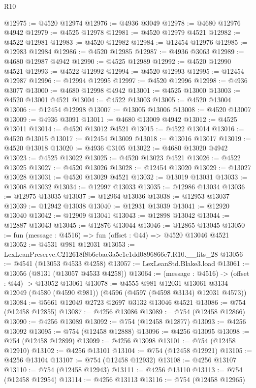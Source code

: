 \begin{lexlean}{R10}
\begin{coremodule}
@12975 := @4520 @12974
@12976 := @4936 @3049
@12978 := @4680 @12976 @4942
@12979 := @4525 @12978
@12981 := @4520 @12979 @4521
@12982 := @4522 @12981
@12983 := @4520 @12982
@12984 := @12454 @12976
@12985 := @12983 @12984
@12986 := @4520 @12985
@12987 := @4936 @3063
@12989 := @4680 @12987 @4942
@12990 := @4525 @12989
@12992 := @4520 @12990 @4521
@12993 := @4522 @12992
@12994 := @4520 @12993
@12995 := @12454 @12987
@12996 := @12994 @12995
@12997 := @4520 @12996
@12998 := @4936 @3077
@13000 := @4680 @12998 @4942
@13001 := @4525 @13000
@13003 := @4520 @13001 @4521
@13004 := @4522 @13003
@13005 := @4520 @13004
@13006 := @12454 @12998
@13007 := @13005 @13006
@13008 := @4520 @13007
@13009 := @4936 @3091
@13011 := @4680 @13009 @4942
@13012 := @4525 @13011
@13014 := @4520 @13012 @4521
@13015 := @4522 @13014
@13016 := @4520 @13015
@13017 := @12454 @13009
@13018 := @13016 @13017
@13019 := @4520 @13018
@13020 := @4936 @3105
@13022 := @4680 @13020 @4942
@13023 := @4525 @13022
@13025 := @4520 @13023 @4521
@13026 := @4522 @13025
@13027 := @4520 @13026
@13028 := @12454 @13020
@13029 := @13027 @13028
@13031 := @4520 @13029 @4521
@13032 := @13019 @13031
@13033 := @13008 @13032
@13034 := @12997 @13033
@13035 := @12986 @13034
@13036 := @12975 @13035
@13037 := @12964 @13036
@13038 := @12953 @13037
@13039 := @12942 @13038
@13040 := @12931 @13039
@13041 := @12920 @13040
@13042 := @12909 @13041
@13043 := @12898 @13042
@13044 := @12887 @13043
@13045 := @12876 @13044
@13046 := @12865 @13045
@13050 := fun (message : @4516) => fun (offset : @44) => @4520 @13046 @4521
@13052 := @4531 @981 @12031
@13053 := LexLeanPreserve.C212618f8b6ebac3a5c1e1dd0896866e7.R10.__fits_28
@13056 := @4541 (@13053 @4533 @4258)
@13057 := LexLeanStd.Blake3.load
@13061 := @13056 (@8131 (@13057 @4533 @4258))
@13064 := (message : @4516) -> (offset : @44) -> @13052 @13061
@13078 := @4555
    @981
    @12031
    @13061
    @3134
    @12049
    (@4580 (@4590 @981))
    (@4596 (@4597 (@4598 @3134) @12031 @4573))
@13084 := @5661 @12049 @2723 @2697 @3132 @13046 @4521
@13086 := @754 (@12458 @12855)
@13087 := @4256 @13086
@13089 := @754 (@12458 @12866)
@13090 := @4256 @13089
@13092 := @754 (@12458 @12877)
@13093 := @4256 @13092
@13095 := @754 (@12458 @12888)
@13096 := @4256 @13095
@13098 := @754 (@12458 @12899)
@13099 := @4256 @13098
@13101 := @754 (@12458 @12910)
@13102 := @4256 @13101
@13104 := @754 (@12458 @12921)
@13105 := @4256 @13104
@13107 := @754 (@12458 @12932)
@13108 := @4256 @13107
@13110 := @754 (@12458 @12943)
@13111 := @4256 @13110
@13113 := @754 (@12458 @12954)
@13114 := @4256 @13113
@13116 := @754 (@12458 @12965)

\end{coremodule}
\end{lexlean}
